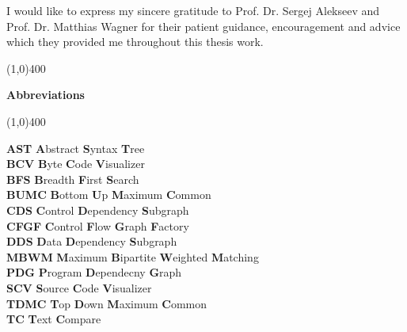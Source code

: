 \documentclass{report}
\newcommand{\Hline}{\par
  \begin{center}
   \line(1,0){400}
   \end{center}
}
\begin{document}
\noindent I would like to express my sincere gratitude to Prof. Dr. Sergej Alekseev and Prof. Dr. Matthias Wagner for their patient guidance, encouragement and advice which they provided me throughout this thesis work.


\newpage
\tableofcontents
\listoffigures
\listoftables

\newpage
{}
\Hline
\begin{center}{\huge\bf Abbreviations\par}\end{center}
\Hline
\vspace{10mm}
\null

\noindent
\textbf{AST} \hspace{24 mm}  \textbf{A}bstract \textbf{S}yntax \textbf{T}ree \\
\textbf{BCV} \hspace{24 mm}  \textbf{B}yte \textbf{C}ode \textbf{V}isualizer \\
\textbf{BFS} \hspace{25 mm}  \textbf{B}readth \textbf{F}irst \textbf{S}earch \\
\textbf{BUMC} \hspace{20 mm} \textbf{B}ottom \textbf{U}p \textbf{M}aximum \textbf{C}ommon \\
\textbf{CDS} \hspace{24 mm}  \textbf{C}ontrol \textbf{D}ependency \textbf{S}ubgraph \\
\textbf{CFGF} \hspace{22 mm} \textbf{C}ontrol \textbf{F}low \textbf{G}raph  \textbf{F}actory \\
\textbf{DDS} \hspace{24 mm}  \textbf{D}ata \textbf{D}ependency \textbf{S}ubgraph \\
\textbf{MBWM} \hspace{18 mm} \textbf{M}aximum \textbf{B}ipartite \textbf{W}eighted \textbf{M}atching \\
\textbf{PDG} \hspace{24 mm}  \textbf{P}rogram \textbf{D}ependecny \textbf{G}raph \\
\textbf{SCV} \hspace{24 mm}  \textbf{S}ource \textbf{C}ode \textbf{V}isualizer \\
\textbf{TDMC} \hspace{20 mm} \textbf{T}op \textbf{D}own \textbf{M}aximum \textbf{C}ommon \\
\textbf{TC} \hspace{27 mm}   \textbf{T}ext \textbf{C}ompare \\
\end{document}
